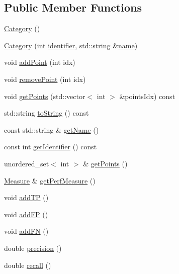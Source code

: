 \subsection*{Public Member Functions}
\begin{DoxyCompactItemize}
\item 
\hyperlink{class_category_adeee911f773db1ebeb1005a00da45e08}{Category} ()
\item 
\hyperlink{class_category_aff8390ac4bbbf06c85648f76b78680d2}{Category} (int \hyperlink{class_category_a10f4f758d6942ef39ca6d1cc5dfb6369}{identifier}, std\+::string \&\hyperlink{class_category_a433491cdb802174ee504a41eea7bc7c7}{name})
\item 
void \hyperlink{class_category_a30dcc955d24ac3a6cfd2b37adbac5e14}{add\+Point} (int idx)
\item 
void \hyperlink{class_category_a213b1e03615488e5ef9ddd6189f8dc16}{remove\+Point} (int idx)
\item 
void \hyperlink{class_category_ad1816cec49d0c93cdc394f3c9292ecbb}{get\+Points} (std\+::vector$<$ int $>$ \&points\+Idx) const
\item 
std\+::string \hyperlink{class_category_a22e764bdb9b0d8d342c2971a1951a818}{to\+String} () const
\item 
const std\+::string \& \hyperlink{class_category_a23af5ca47bddcf85828a835ae188ed1f}{get\+Name} ()
\item 
const int \hyperlink{class_category_aad52cad1dde01976b9ee2fba33fb3661}{get\+Identifier} () const
\item 
unordered\+\_\+set$<$ int $>$ \& \hyperlink{class_category_af7bf3e19fc53d93b8c0d88974a03227c}{get\+Points} ()
\item 
\hyperlink{class_measure}{Measure} \& \hyperlink{class_category_a4752e892d1b8b078bfd4d9e1c13f8082}{get\+Perf\+Measure} ()
\item 
void \hyperlink{class_category_afb7ad18835edec07acf3c6129204f63d}{add\+TP} ()
\item 
void \hyperlink{class_category_a8ed7b1ffad6f82547b8d1fd68a1926f7}{add\+FP} ()
\item 
void \hyperlink{class_category_a6211d9ab0c6e542ce8ad675f7f51472f}{add\+FN} ()
\item 
double \hyperlink{class_category_aba83338fa764aa9d9157de0f2c24b07f}{precision} ()
\item 
double \hyperlink{class_category_a778001a2865033dbfb99fcc136815295}{recall} ()
\end{DoxyCompactItemize}
